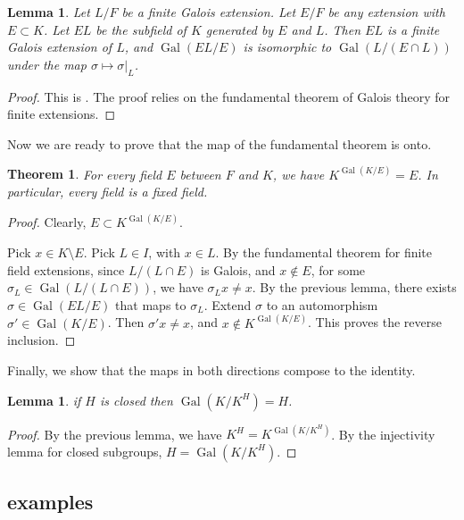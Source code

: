\documentclass{amsart}
\newtheorem{theorem}[equation]{Theorem}
\newtheorem{lemma}[equation]{Lemma}
\def\op#1{{\operatorname{#1}}}
\def\oG{\op{Gal}}
\begin{document}
\begin{lemma}
Let $L/F$ be a finite Galois extension.  Let $E/F$ be any extension with $E\subset K$.
Let $EL$ be the subfield of $K$ generated by $E$ and $L$.  Then
$EL$ is a finite Galois extension of $L$, and 
$\oG(EL/E)$ is isomorphic to $\oG(L/(E\cap L))$ under the map 
$\sigma\mapsto\sigma|_L$.
\end{lemma}

\begin{proof} This is \cite[14.4~Prop.~19]{DF}. The proof relies on the fundamental
theorem of Galois theory for finite extensions.
\end{proof}


Now we are ready to prove that the map of the fundamental theorem is onto.

\begin{theorem}
For every field $E$ between $F$ and $K$, we have $K^{\oG(K/E)}  = E$.
In particular, every field is a fixed field.
\end{theorem}

\begin{proof} 
Clearly, $E\subset K^{\oG(K/E)}$.

Pick $x\in K\setminus E$.  Pick $L\in I$, with $x\in L$.
  By the fundamental theorem for finite field extensions, since
  $L/(L\cap E)$ is Galois, and $x\not\in E$, for some $\sigma_L\in
  \oG(L/(L\cap E))$, we have $\sigma_L x \ne x$.
By the previous lemma, there exists $\sigma\in \oG(EL/E)$ that maps
to $\sigma_L$.  Extend $\sigma$ to an automorphism $\sigma'\in\oG(K/E)$.
Then $\sigma'x \ne x$, and $x\not\in K^{\oG(K/E)}$.  
This proves the reverse inclusion.
\end{proof}

Finally, we show that the maps in both directions compose to the identity.

\begin{lemma} if $H$ is closed then $\oG(K/K^H) = H$.
\end{lemma}

\begin{proof}
By the previous lemma,
we have $K^H = K^{\oG(K/K^H)}$.  By the injectivity lemma for closed subgroups,
$H = \oG(K/K^H)$.
\end{proof}



\subsection{examples}
\end{document}

